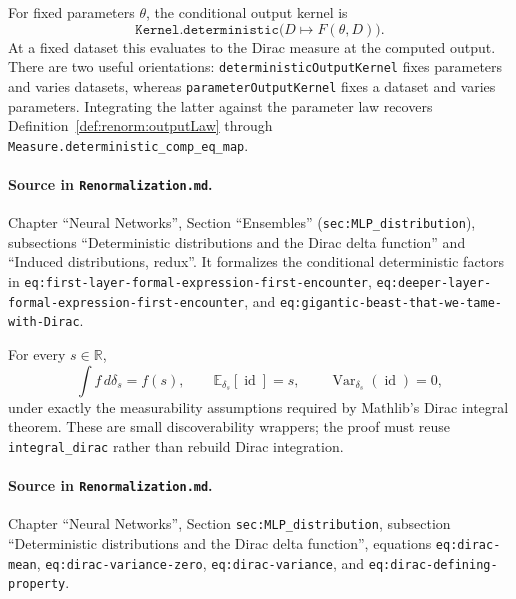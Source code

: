 \begin{definition}
\label{def:renorm:detOutputKernel}
For fixed parameters $\theta$, the conditional output kernel is
\[
  \texttt{Kernel.deterministic}\bigl(D\mapsto F(\theta,D)\bigr).
\]
At a fixed dataset this evaluates to the Dirac measure at the computed output.  There are two
useful orientations: \texttt{deterministicOutputKernel} fixes parameters and varies datasets,
whereas \texttt{parameterOutputKernel} fixes a dataset and varies parameters.  Integrating the
latter against the parameter law recovers Definition~\ref{def:renorm:outputLaw} through
\texttt{Measure.deterministic\_comp\_eq\_map}.

\paragraph{Source in \texttt{Renormalization.md}.}
Chapter ``Neural Networks'', Section ``Ensembles'' (\texttt{sec:MLP\_distribution}), subsections
``Deterministic distributions and the Dirac delta function'' and ``Induced distributions, redux''.
It formalizes the conditional deterministic factors in
\texttt{eq:first-layer-formal-expression-first-encounter},
\texttt{eq:deeper-layer-formal-expression-first-encounter}, and
\texttt{eq:gigantic-beast-that-we-tame-with-Dirac}.
\end{definition}

\begin{lemma}
\label{lem:renorm:diracMoments}
For every $s\in\mathbb R$,
\[
  \int f\,d\delta_s=f(s),\qquad
  \mathbb E_{\delta_s}[\operatorname{id}]=s,\qquad
  \operatorname{Var}_{\delta_s}(\operatorname{id})=0,
\]
under exactly the measurability assumptions required by Mathlib's Dirac integral theorem.
These are small discoverability wrappers; the proof must reuse \texttt{integral\_dirac} rather than
rebuild Dirac integration.

\paragraph{Source in \texttt{Renormalization.md}.}
Chapter ``Neural Networks'', Section \texttt{sec:MLP\_distribution}, subsection ``Deterministic
distributions and the Dirac delta function'', equations \texttt{eq:dirac-mean},
\texttt{eq:dirac-variance-zero}, \texttt{eq:dirac-variance}, and
\texttt{eq:dirac-defining-property}.
\end{lemma}


